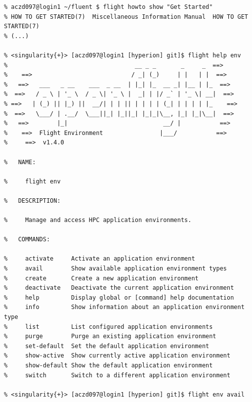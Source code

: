 \begin{verbatim}
% aczd097@login1 ~/fluent $ flight howto show "Get Started"
% HOW TO GET STARTED(7)  Miscellaneous Information Manual  HOW TO GET STARTED(7)
% (...)

% <singularity{+}> [aczd097@login1 [hyperion] git]$ flight help env
%                                    __ _ _       _     _  ==>
%    ==>                            / _| (_)     | |   | |  ==>
%   ==>   ___   _ __    ___  _ __  | |_| |_  __ _| |__ | |_  ==>
%  ==>   / _ \ | '_ \  / _ \| '_ \ |  _| | |/ _` | '_ \| __|  ==>
% ==>   | (_) || |_) ||  __/| | | || | | | | (_| | | | | |_    ==>
%  ==>   \___/ | .__/  \___||_| |_||_| |_|_|\__, |_| |_|\__|  ==>
%   ==>        |_|                           __/ |           ==>
%    ==>  Flight Environment                |___/           ==>
%     ==>  v1.4.0

%   NAME:

%     flight env

%   DESCRIPTION:

%     Manage and access HPC application environments.

%   COMMANDS:

%     activate     Activate an application environment
%     avail        Show available application environment types
%     create       Create a new application environment
%     deactivate   Deactivate the current application environment
%     help         Display global or [command] help documentation
%     info         Show information about an application environment type
%     list         List configured application environments
%     purge        Purge an existing application environment
%     set-default  Set the default application environment
%     show-active  Show currently active application environment
%     show-default Show the default application environment
%     switch       Switch to a different application environment

% <singularity{+}> [aczd097@login1 [hyperion] git]$ flight env avail


\end{verbatim}
